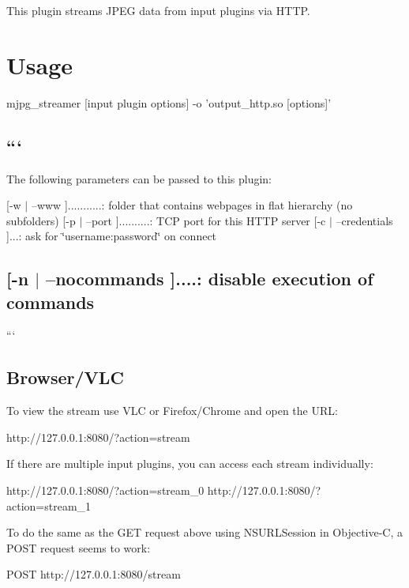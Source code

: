This plugin streams J\+P\+E\+G data from input plugins via H\+T\+T\+P.

\section*{Usage }

\begin{DoxyVerb}mjpg_streamer [input plugin options] -o 'output_http.so [options]'
\end{DoxyVerb}


\subsection*{``` }

The following parameters can be passed to this plugin\+:

\mbox{[}-\/w $\vert$ --www \mbox{]}...........\+: folder that contains webpages in flat hierarchy (no subfolders) \mbox{[}-\/p $\vert$ --port \mbox{]}..........\+: T\+C\+P port for this H\+T\+T\+P server \mbox{[}-\/c $\vert$ --credentials \mbox{]}...\+: ask for \char`\"{}username\+:password\char`\"{} on connect \subsection*{\mbox{[}-\/n $\vert$ --nocommands \mbox{]}....\+: disable execution of commands }

```

\subsection*{Browser/\+V\+L\+C }

To view the stream use V\+L\+C or Firefox/\+Chrome and open the U\+R\+L\+: \begin{DoxyVerb}http://127.0.0.1:8080/?action=stream
\end{DoxyVerb}


If there are multiple input plugins, you can access each stream individually\+: \begin{DoxyVerb}http://127.0.0.1:8080/?action=stream_0
http://127.0.0.1:8080/?action=stream_1
\end{DoxyVerb}


To do the same as the G\+E\+T request above using N\+S\+U\+R\+L\+Session in Objective-\/\+C, a P\+O\+S\+T request seems to work\+: \begin{DoxyVerb}POST http://127.0.0.1:8080/stream 
\end{DoxyVerb}


